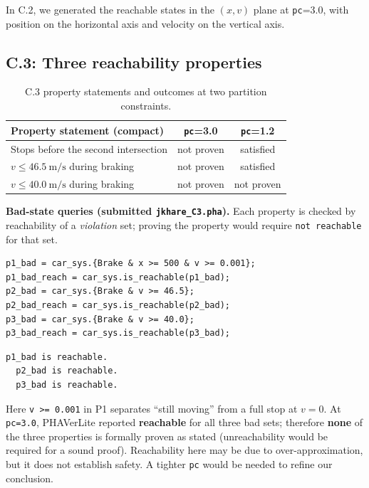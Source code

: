 \documentclass[10pt]{article}
\begin{document}
\noindent In C.2, we generated the reachable states in the $(x,v)$ plane at \texttt{pc}=3.0, with position on the horizontal axis and velocity on the vertical axis.

\subsection*{C.3: Three reachability properties}

\begin{table}[H]
\centering
\begin{tabular}{p{} c c}
\toprule
Property statement (compact) & \texttt{pc}=3.0 & \texttt{pc}=1.2 \\
\midrule
Stops before the second intersection & not proven & satisfied \\
$v \le \SI{46.5}{\meter\per\second}$ during braking & not proven & satisfied \\
$v \le \SI{40.0}{\meter\per\second}$ during braking & not proven & not proven \\
\bottomrule
\end{tabular}
\caption{C.3 property statements and outcomes at two partition constraints.}
\label{tab:c3_properties}
\end{table}

\medskip
\noindent\textbf{Bad-state queries (submitted \texttt{jkhare\_C3.pha}).} Each property is checked by reachability of a \emph{violation} set; proving the property would require \texttt{not reachable} for that set.
\begin{lstlisting}[style=phaver]
p1_bad = car_sys.{Brake & x >= 500 & v >= 0.001};
p1_bad_reach = car_sys.is_reachable(p1_bad);
p2_bad = car_sys.{Brake & v >= 46.5};
p2_bad_reach = car_sys.is_reachable(p2_bad);
p3_bad = car_sys.{Brake & v >= 40.0};
p3_bad_reach = car_sys.is_reachable(p3_bad);
\end{lstlisting}

\begin{lstlisting}[style=phaver,caption={C.3: PHAVerLite output summary for the three property checks with pc=3.0},label={fig:c3_output}]
  p1_bad is reachable.
  p2_bad is reachable.
  p3_bad is reachable.
  \end{lstlisting}


\noindent Here \texttt{v >= 0.001} in P1 separates ``still moving'' from a full stop at $v=0$. At \texttt{pc=3.0}, PHAVerLite reported \textbf{reachable} for all three bad sets; therefore \textbf{none} of the three properties is formally proven as stated (unreachability would be required for a sound proof). Reachability here may be due to over-approximation, but it does not establish safety. A tighter \texttt{pc} would be needed to refine our conclusion.
\end{document}
